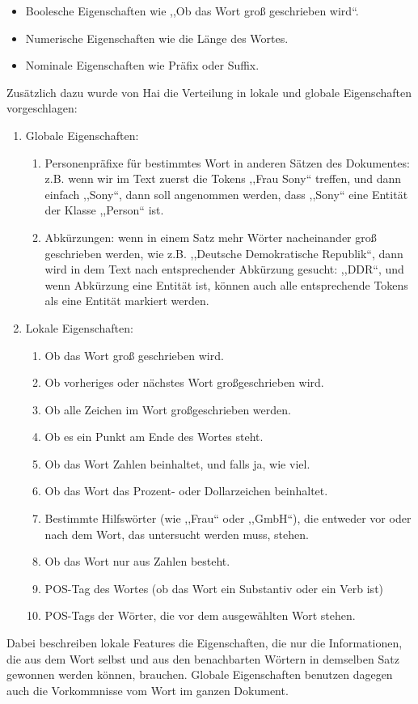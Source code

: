 \begin{itemize}
\item Boolesche Eigenschaften wie ,,Ob das Wort groß geschrieben wird``.
\item Numerische Eigenschaften wie die Länge des Wortes.
\item Nominale Eigenschaften wie Präfix oder Suffix.
\end{itemize}
Zusätzlich dazu wurde von Hai\cite{chieu2002named} die Verteilung in lokale und globale Eigenschaften vorgeschlagen:

\begin{enumerate}
\item Globale Eigenschaften:
\begin{enumerate}
\item Personenpräfixe für bestimmtes Wort in anderen Sätzen des Dokumentes: z.B. wenn wir im Text zuerst die Tokens ,,Frau Sony`` treffen, und dann einfach ,,Sony``, dann soll angenommen werden, dass ,,Sony`` eine Entität der Klasse ,,Person`` ist.
\item Abkürzungen: wenn in einem Satz mehr Wörter nacheinander groß geschrieben werden, wie z.B. ,,Deutsche Demokratische Republik``, dann wird in dem Text nach entsprechender Abkürzung gesucht: ,,DDR``, und wenn Abkürzung eine Entität ist, können auch alle entsprechende Tokens als eine Entität markiert werden.
\end{enumerate}
\item Lokale Eigenschaften:
\begin{enumerate}
\item Ob das Wort groß geschrieben wird.
\item Ob vorheriges oder nächstes Wort großgeschrieben wird.
\item Ob alle Zeichen im Wort großgeschrieben werden.
\item Ob es ein Punkt am Ende des Wortes steht.
\item Ob das Wort Zahlen beinhaltet, und falls ja, wie viel.
\item Ob das Wort das Prozent- oder Dollarzeichen beinhaltet.
\item Bestimmte Hilfswörter (wie ,,Frau`` oder ,,GmbH``), die entweder vor oder nach dem Wort, das untersucht werden muss, stehen.
\item Ob das Wort nur aus Zahlen besteht.
\item POS-Tag des Wortes (ob das Wort ein Substantiv oder ein Verb ist)
\item POS-Tags der Wörter, die vor dem ausgewählten Wort stehen.
\end{enumerate}
\end{enumerate}
Dabei beschreiben lokale Features die Eigenschaften, die nur die Informationen, die aus dem Wort selbst und aus den benachbarten Wörtern in demselben Satz gewonnen werden können, brauchen. Globale Eigenschaften benutzen dagegen auch die Vorkommnisse vom Wort im ganzen Dokument.

